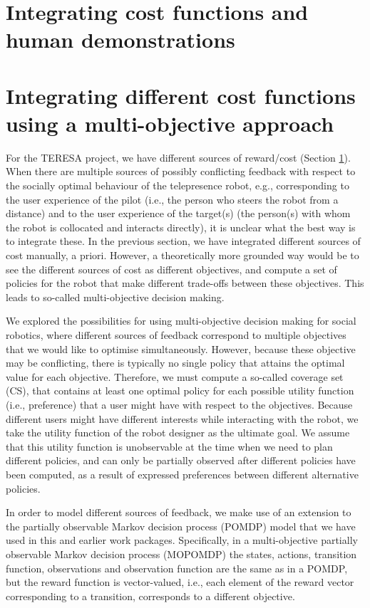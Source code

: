 \documentclass[a4paper,11pt]{report}
\begin{document}
\section{Integrating cost functions and human demonstrations}\label{sec:integratecost}

\section{Integrating different cost functions using a multi-objective approach}
For the TERESA project, we have different sources of reward/cost (Section \ref{sec:integratecost}). When there are multiple sources of possibly conflicting feedback with respect to the socially optimal behaviour of the telepresence robot, e.g.,  corresponding to the user experience of the pilot (i.e., the person who steers the robot from a distance) and to the user experience of the target(s) (the person(s) with whom the robot is collocated and interacts directly), it is unclear what the best way is to integrate these. In the previous section, we have integrated different sources of cost manually, a priori. However, a theoretically more grounded way would be to see the different sources of cost as different objectives, and compute a set of policies for the robot that make different trade-offs between these objectives. This leads to so-called multi-objective decision making. 

We explored the possibilities for using multi-objective decision making for social robotics,  where different sources of feedback correspond to multiple objectives that we would like to optimise simultaneously. However, because these objective may be conflicting, there is typically no single policy that attains the optimal value for each objective. Therefore, we must compute a so-called coverage set (CS), that contains at least one optimal policy for each possible utility function (i.e., preference) that a user might have with respect to the objectives. Because different users might have different interests while interacting with the robot, we take the utility function of the robot designer as the ultimate goal. We assume that this utility function is unobservable at the time when we need to plan different policies, and can only be partially observed after different policies have been computed, as a result of expressed preferences between different alternative policies.

In order to model different sources of feedback, we make use of an extension to the partially observable Markov decision process (POMDP) model that we have used in this and earlier work packages. Specifically, in a multi-objective partially observable Markov decision process (MOPOMDP) the states, actions, transition function, observations and observation function are the same as in a POMDP, but the reward function is vector-valued, i.e., each element of the reward vector corresponding to a transition, corresponds to a different objective. 
\end{document}

